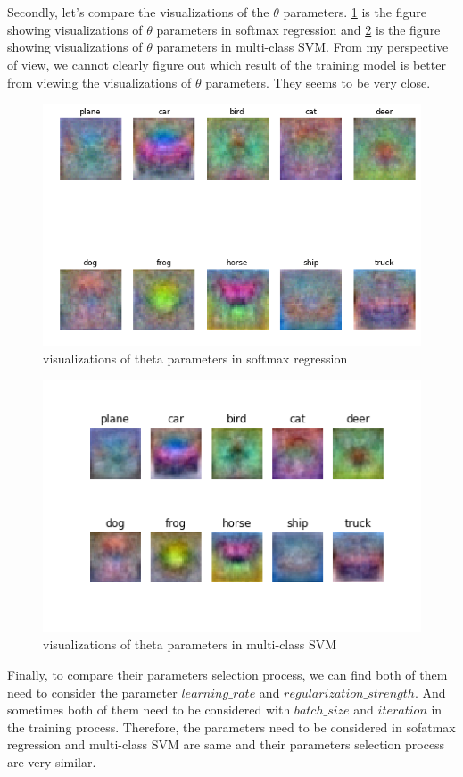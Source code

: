 \documentclass[paper=a4, fontsize=11pt]{scrartcl} %
\numberwithin{equation}{section} %
\numberwithin{figure}{section} %
\numberwithin{table}{section} %
\begin{document}
\\
\\ Secondly, let's compare the visualizations of the $\theta$ parameters. \ref{fig:softmax_theta} is the figure showing visualizations of $\theta$ parameters in softmax regression and \ref{fig:SVM_theta} is the figure showing visualizations of $\theta$ parameters in multi-class SVM. From my perspective of view, we cannot clearly figure out which result of the training model is better from viewing the visualizations of $\theta$ parameters. They seems to be very close.
\begin{figure}[H]
 	\centering
 	\includegraphics[scale=0.36]{./../softmax_theta}
 	\caption{visualizations of theta parameters in softmax regression}
 	\label{fig:softmax_theta}
\end{figure}
\begin{figure}[H]
 	\centering
 	\includegraphics[scale=0.6]{./../multiclass_svm_theta.png}
 	\caption{visualizations of theta parameters in multi-class SVM}
 	\label{fig:SVM_theta}
\end{figure}

Finally, to compare their parameters selection process, we can find both of them need to consider the parameter $learning\_rate$ and $regularization\_strength$. And sometimes both of them need to be considered with $batch\_size$ and $iteration$ in the training process. Therefore, the parameters need to be considered in sofatmax regression and multi-class SVM are same and their parameters selection process are very similar.
\end{document}
